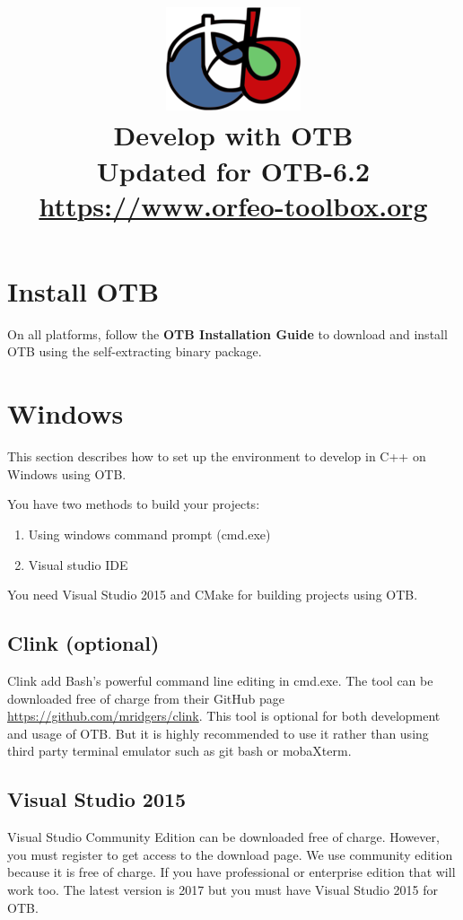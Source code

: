 \documentclass[10pt,a4paper]{article}
\title{\includegraphics[scale=1]{Art/otb-logo.png}\\
  Develop with OTB\\
  Updated for OTB-6.2\\
  {\small\url{https://www.orfeo-toolbox.org}}
}
\begin{document}
\maketitle

\tableofcontents

\clearpage

\section{Install OTB}

On all platforms, follow the \textbf{OTB Installation Guide} to
download and install OTB using the self-extracting binary package.

\section{Windows}

This section describes how to set up the environment to develop in C++
on Windows using OTB.

You have two methods to build your projects:
\begin{enumerate}
\item Using windows command prompt (cmd.exe)
\item Visual studio IDE
\end{enumerate}

You need Visual Studio 2015 and CMake for building projects using OTB.

\subsection{Clink (optional)}

Clink add Bash's powerful command line editing in cmd.exe. The tool
can be downloaded free of charge from their GitHub page
\url{https://github.com/mridgers/clink}. This tool is optional for
both development and usage of OTB.  But it is highly recommended to
use it rather than using third party terminal emulator such as git
bash or mobaXterm.

\subsection{Visual Studio 2015}

Visual Studio Community Edition can be downloaded free of
charge. However, you must register to get access to the download
page. We use community edition because it is free of charge. If you
have professional or enterprise edition that will work too. The latest
version is 2017 but you must have Visual Studio 2015 for OTB. 
\end{document}
